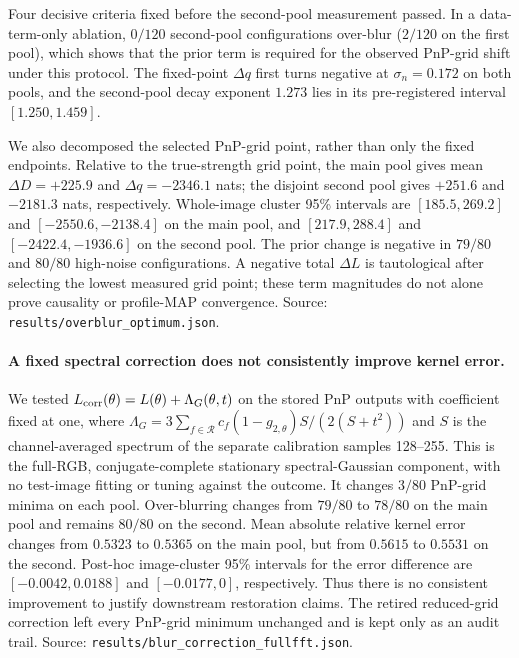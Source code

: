 \documentclass[10pt,journal]{IEEEtran}
\begin{document}
Four decisive criteria fixed before the second-pool measurement passed. In a data-term-only
ablation, $0/120$ second-pool configurations over-blur ($2/120$ on the first pool), which
shows that the prior term is required for the observed PnP-grid shift under this protocol. The
fixed-point $\Delta q$ first turns negative at $\sigma_n=0.172$ on both pools, and the
second-pool decay exponent $1.273$ lies in its pre-registered interval $[1.250,1.459]$.

We also decomposed the selected PnP-grid point, rather than only the fixed endpoints. Relative
to the true-strength grid point, the main pool gives mean $\Delta D=+225.9$ and
$\Delta q=-2346.1$ nats; the disjoint second pool gives $+251.6$ and $-2181.3$ nats,
respectively. Whole-image cluster 95\% intervals are $[185.5,269.2]$ and $[-2550.6,-2138.4]$
on the main pool, and $[217.9,288.4]$ and $[-2422.4,-1936.6]$ on the second pool.
The prior change is negative in $79/80$ and $80/80$ high-noise configurations. A negative total
$\Delta L$ is tautological after selecting the lowest measured grid point; these term magnitudes
do not alone prove causality or profile-MAP convergence. Source:
\texttt{results/overblur\_optimum.json}.

\paragraph*{A fixed spectral correction does not consistently improve kernel error.}
We tested $L_{\rm corr}(\theta)=L(\theta)+\Lambda_G(\theta,t)$ on the stored PnP outputs with
coefficient fixed at one, where
$\Lambda_G=3\sum_{f\in\mathcal R}c_f(1-g_{2,\theta})S/(2(S+t^2))$ and $S$ is the
channel-averaged spectrum of the separate calibration samples 128--255. This is the full-RGB,
conjugate-complete stationary spectral-Gaussian component, with no test-image fitting or tuning
against the outcome. It changes $3/80$ PnP-grid minima on each pool. Over-blurring changes from
$79/80$ to $78/80$ on the main pool and remains $80/80$ on the second. Mean absolute relative
kernel error changes from $0.5323$ to $0.5365$ on the main pool, but from $0.5615$ to $0.5531$
on the second. Post-hoc image-cluster 95\% intervals for the error difference are
$[-0.0042,0.0188]$ and $[-0.0177,0]$, respectively. Thus there is no consistent improvement to
justify downstream restoration claims. The retired reduced-grid correction left every PnP-grid
minimum unchanged and is kept only as an audit trail. Source:
\texttt{results/blur\_correction\_fullfft.json}.
\end{document}
